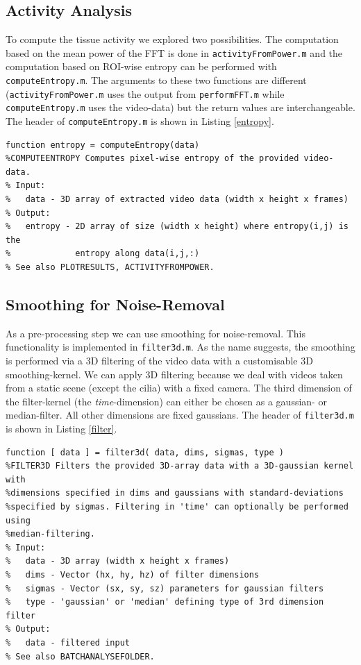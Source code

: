\documentclass[11pt]{scrartcl}
\begin{document}
\subsection{Activity Analysis}

To compute the tissue activity we explored two possibilities. The computation based on the mean power of the FFT is done in \texttt{activityFromPower.m} and the computation based on ROI-wise entropy can be performed with \texttt{computeEntropy.m}. The arguments to these two functions are different (\texttt{activityFromPower.m} uses the output from \texttt{performFFT.m} while \texttt{computeEntropy.m} uses the video-data) but the return values are interchangeable.  The header of \texttt{computeEntropy.m} is shown in Listing \ref{entropy}.

\begin{minipage}{\linewidth}
  \begin{lstlisting}[caption={Function performing the activity analysis using entropy.}, label=entropy]
function entropy = computeEntropy(data) 
%COMPUTEENTROPY Computes pixel-wise entropy of the provided video-data.
% Input:
%   data - 3D array of extracted video data (width x height x frames)
% Output:
%   entropy - 2D array of size (width x height) where entropy(i,j) is the
%             entropy along data(i,j,:)
% See also PLOTRESULTS, ACTIVITYFROMPOWER.
  \end{lstlisting}
\end{minipage}

\subsection{Smoothing for Noise-Removal}

As a pre-processing step we can use smoothing for noise-removal. This functionality is implemented in \texttt{filter3d.m}. As the name suggests, the smoothing is performed via a 3D filtering of the video data with a customisable 3D smoothing-kernel. We can apply 3D filtering because we deal with videos taken from a static scene (except the cilia) with a fixed camera. The third dimension of the filter-kernel (the \textit{time}-dimension) can either be chosen as a gaussian- or median-filter. All other dimensions are fixed gaussians. The header of \texttt{filter3d.m} is shown in Listing \ref{filter}.


\begin{minipage}{\linewidth}
  \begin{lstlisting}[caption={Function performing the noise removal.}, label=filter]
function [ data ] = filter3d( data, dims, sigmas, type )
%FILTER3D Filters the provided 3D-array data with a 3D-gaussian kernel with
%dimensions specified in dims and gaussians with standard-deviations
%specified by sigmas. Filtering in 'time' can optionally be performed using
%median-filtering.
% Input:
%   data - 3D array (width x height x frames)
%   dims - Vector (hx, hy, hz) of filter dimensions
%   sigmas - Vector (sx, sy, sz) parameters for gaussian filters
%   type - 'gaussian' or 'median' defining type of 3rd dimension filter
% Output:
%   data - filtered input
% See also BATCHANALYSEFOLDER.
  \end{lstlisting}
\end{minipage}
\end{document}
